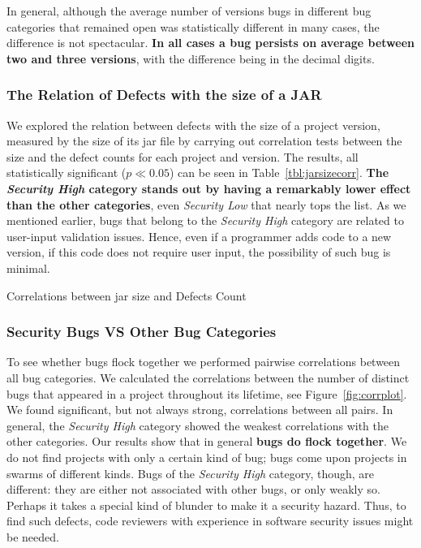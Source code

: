 \documentclass[letterpaper,twocolumn,10pt]{article}
\begin{document}
In general, although the average number of versions bugs in different
bug categories that remained open was statistically different in many
cases, the difference is not spectacular. \textbf{In all cases a bug persists
on average between two and three versions}, with the difference being
in the decimal digits.

\subsubsection{The Relation of Defects with the size of a JAR}

We explored the relation between defects with the size of a project
version, measured by the size of its {\sc jar} file by carrying out
correlation tests between the size and the defect counts for each
project and version. The results, all statistically significant ($p
\ll 0.05$) can be seen in Table~\ref{tbl:jarsizecorr}.  \textbf{The {\it
  Security High} category stands out by having a remarkably lower
effect than the other categories}, even {\it Security Low} that nearly
tops the list. As we mentioned earlier, bugs that belong to the
{\it Security High} category are related to
user-input validation issues. Hence, even if a programmer adds
code to a new version, if this code does not require user
input, the possibility of such bug is minimal. 

\begin{table}[hbt]
    \centering
    \caption{Correlations between {\sc jar} size and Defects Count}
    \label{tbl:jarsizecorr}
    
\end{table}

\subsubsection{Security Bugs VS Other Bug Categories}

To see whether bugs flock together we performed pairwise correlations
between all bug categories. We calculated the correlations between the
number of distinct bugs that appeared in a project throughout its
lifetime, see Figure~\ref{fig:corrplot}. We found significant, but not always
strong, correlations between all pairs. In general, the {\it Security
  High} category showed the weakest correlations with the other
categories. Our results show that in general \textbf{bugs do flock together}.
We do not find projects with only a certain kind of bug; bugs come
upon projects in swarms of different kinds. Bugs of the {\it Security
  High} category, though, are different: they are either not
associated with other bugs, or only weakly so. Perhaps it takes a
special kind of blunder to make it a security hazard. Thus, to find such
defects, code reviewers with experience in software security
issues might be needed.
\end{document}
